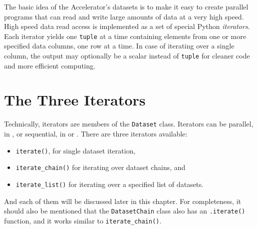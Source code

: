 
\label{chap:iterators}

The basic idea of the Accelerator's datasets is to make it easy to
create parallel programs that can read and write large amounts of data
at a very high speed.  High speed data read access is implemented as a
set of special Python \textsl{iterators}.  Each iterator yields
one \texttt{tuple} at a time containing elements from one or more
specified data columns, one row at a time.  In case of iterating over
a single column, the output may optionally be a scalar instead
of \texttt{tuple} for cleaner code and more efficient computing.



\section{The Three Iterators}
Technically, iterators are members of the \texttt{Dataset} class.
Iterators can be parallel, in \analysis, or sequential, in \prepare
or \synthesis.  There are three iterators available:
\begin{itemize}
\item [] \texttt{iterate()}, for single dataset iteration,
\item [] \texttt{iterate\_chain()} for iterating over dataset chains, and
\item [] \texttt{iterate\_list()} for iterating over a specified list of datasets.
\end{itemize}
And each of them will be discussed later in this chapter.  For
completeness, it should also be mentioned that
the \texttt{DatasetChain} class also has an \texttt{.iterate()}
function, and it works similar to \texttt{iterate\_chain()}.

